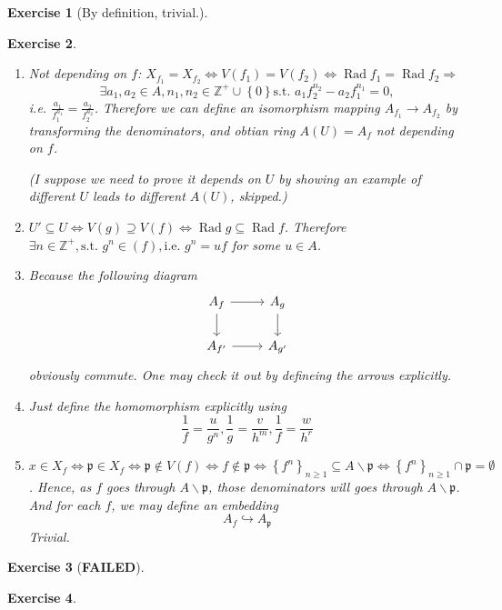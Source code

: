 \documentclass{article}
\theoremstyle{breakstyle}
\newtheorem{exercise}{Exercise}
\DeclareMathOperator{\rad}{Rad}
\begin{document}
\begin{exercise}[By definition, trivial.]
\end{exercise}

\begin{exercise}
    \leavevmode \vspace{-\baselineskip}
    \begin{enumerate}[label=({\roman*})]
        \item \emph{Not depending on $f$}:
            $X_{f_1}=X_{f_2}\Leftrightarrow V(f_1)=V(f_2)\Leftrightarrow \rad{f_1}=\rad{f_2}\Rightarrow $
            $$
            \exists a_1,a_2\in A,n_1,n_2\in \mathbb{Z}^{+}\cup \left\{ 0 \right\} 
            \text{s.t. }a_1f_2^{n_2}-a_2f_1^{n_1}=0
            ,$$
            i.e. $\frac{a_1}{f_1^{n_1}}=\frac{a_2}{f_2^{n_2}}$.
            Therefore we can define an isomorphism mapping $A_{f_{1}}\longrightarrow A_{f_{2}}$ by transforming the denominators,
            and obtian ring $A(U)=A_{f}$ not depending on $f$.

            \emph{(I suppose we need to prove it depends on $U$ by showing an example of different $U$ leads to different $A(U)$, skipped.)}
        \item 
            $U'\subseteq U\Leftrightarrow V(g)\supseteq V(f)\Leftrightarrow \rad{g}\subseteq \rad{f}$.
            Therefore $\exists n \in \mathbb{Z}^{+},\text{s.t. }g^{n}\in (f),\text{i.e. }g^{n}=uf$ for some $u\in A$.
        \item 
            Because the following diagram
            $$
            \begin{tikzcd}
            A_f \arrow[r] \arrow[d] & A_g \arrow[d] \\
            A_{f'} \arrow[r]        & A_{g'}       
            \end{tikzcd}
            $$
            obviously commute.
            One may check it out by defineing the arrows explicitly.
        \item 
            Just define the homomorphism explicitly using
            $$
            \frac{1}{f}=\frac{u}{g^{n}},\frac{1}{g}=\frac{v}{h^{m}},\frac{1}{f}=\frac{w}{h^{r}}
            $$
        \item 
            $x\in X_{f}
            \Leftrightarrow \mathfrak{p}\in X_{f}
            \Leftrightarrow \mathfrak{p}\not\in V(f)
            \Leftrightarrow f\not\in \mathfrak{p}
            \Leftrightarrow \left\{ f^{n} \right\} _{n\ge 1}\subseteq A\backslash \mathfrak{p}
            \Leftrightarrow \left\{ f^{n} \right\} _{n\ge 1}\cap \mathfrak{p}=\emptyset$.
            Hence, as $f$ goes through $A\backslash \mathfrak{p}$,
            those denominators will goes through $A\backslash \mathfrak{p}$.
            And for each $f$, we may define an embedding
            $$
            A_{f}\hookrightarrow A_{\mathfrak{p}}
            $$
            Trivial.
    \end{enumerate}
\end{exercise}

\begin{exercise}[\textbf{FAILED}]
\end{exercise}

\begin{exercise}
    
\end{exercise}
\end{document}
